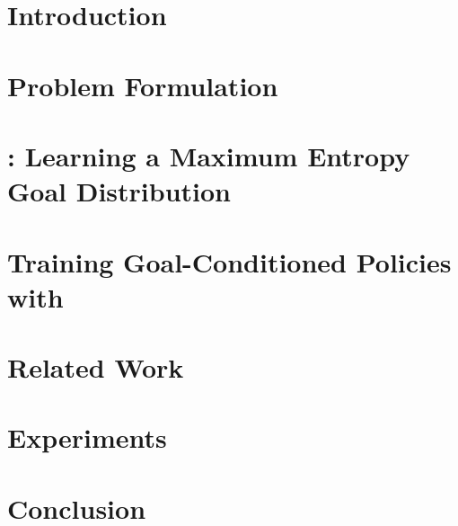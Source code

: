 \section{Introduction}\label{sec:introduction}


\setlength{\textfloatsep}{0.5\baselineskip plus 0.2\baselineskip minus 0.2\baselineskip}
\setlength{\dbltextfloatsep}{0.5\baselineskip plus 0.2\baselineskip minus 0.2\baselineskip}

\section{Problem Formulation}\label{sec:background}


\section{\METHOD: Learning a Maximum Entropy Goal Distribution}
\label{sec:method}


\section{Training Goal-Conditioned Policies with \METHOD}
\label{sec:train-policy}


\section{Related Work}\label{sec:related_work}


\section{Experiments}\label{sec:experiments}


\section{Conclusion}\label{sec:conclusion}



% 
% 

% 

% 
